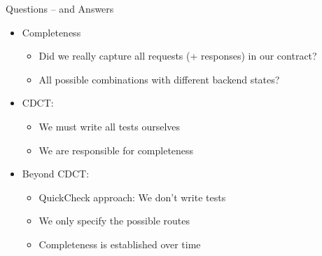 \begin{frame}[fragile]{Questions -- and Answers}

\begin{itemize}
\item Completeness
\begin{itemize}
\item Did we really capture all requests (+ responses) in our contract?
\item All possible combinations with different backend states?
\end{itemize}
\end{itemize}

\onslide<+->
\begin{itemize}[<+->]
\item CDCT:
\begin{itemize}
\item We must write all tests ourselves
\item We are responsible for completeness
\end{itemize}
\vspace{.4em}
\item Beyond CDCT:
\begin{itemize}
\item QuickCheck approach: We don't write tests
\item We only specify the possible routes
\item Completeness is established over time
\end{itemize}
\end{itemize}

\end{frame}


